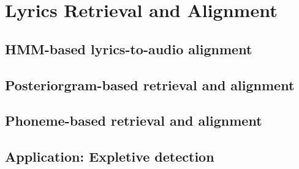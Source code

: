 \chapter{Lyrics Retrieval and Alignment} \label{chap:retrieval_alignment}
\section{HMM-based lyrics-to-audio alignment}
\section{Posteriorgram-based retrieval and alignment}
\section{Phoneme-based retrieval and alignment}
\section{Application: Expletive detection}
